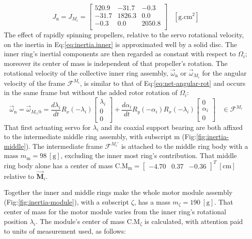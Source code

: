 \begin{equation} \label{eq:inertia.inner}
J_\text{n}=J_{M_i}=\begin{bmatrix}
520.9 & -31.7	& -0.3\\
-31.7 & 1826.3 & 0.0\\
-0.3 & 0.0	& 2050.8\\
\end{bmatrix}~~~~[\text{g.cm}^2]
\end{equation}
The effect of rapidly spinning propellers, relative to the servo rotational velocity, on the inertia in Eq:\ref{eq:inertia.inner} is approximated well by a solid disc. The inner ring's inertial components are then regarded as constant with respect to $\Omega_i$; moreover its center of mass is independent of that propeller's rotation. The rotational velocity of the collective inner ring assembly, $\vec{\omega}_\text{n}$ or $\vec{\omega}_{M_i}$ for the angular velocity of the frame $\mathcal{F}^{M_i}$, is similar to that of Eq:\ref{eq:net-angular-rot} and occurs in the same frame but without the added rotor rotation of $\Omega_i$:
\begin{equation}\label{eq:net-angular-inner}
\vec{\omega}_\text{n}=\vec{\omega}_{M_i/b}=\frac{d\lambda_i}{dt}R_x(-\lambda_i)\begin{bmatrix}
\lambda_i\\
0\\
0
\end{bmatrix}
+\frac{d\alpha_i}{dt}R_y(-\alpha_i)R_x(-\lambda_i)\begin{bmatrix}
0\\
\alpha_i\\
0
\end{bmatrix}~~~~\in\mathcal{F}^{M_i}
\end{equation}
That first actuating servo for $\lambda_i$ and its coaxial support bearing are both affixed to the intermediate middle ring assembly, with subscript m (Fig:\ref{fig:inertia-middle}). The intermediate frame $\mathcal{F}^{M_i'}$ is attached to the middle ring body with a mass $m_\text{m}=98~[\text{g}]$, excluding the inner most ring's contribution. That middle ring body alone has a center of mass $\text{C.M}_{\text{m}}=\begin{bmatrix}
-4.70&0.37&-0.36\end{bmatrix}^T~[\text{cm}]$ relative to $\vec{\mathbf{M}}_i$.
\par
Together the inner and middle rings make the whole motor module assembly (Fig:\ref{fig:inertia-module}), with a subscript $\zeta$, has a mass $m_{\zeta}=190~[\text{g}]$. That center of mass for the motor module varies from the inner ring's rotational position $\lambda_i$. The module's center of mass $\text{C.M}_{\zeta}$ is calculated, with attention paid to units of measurement used, as follows:
